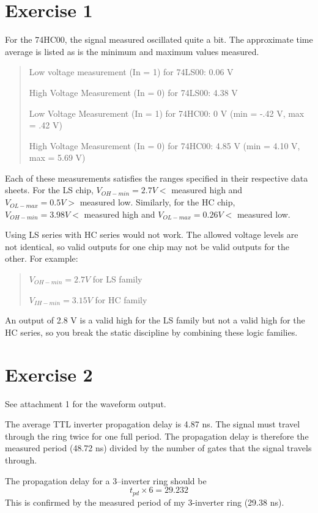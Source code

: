 \documentclass{article}
\author{Bo Shi}
\begin{document}
\section{Exercise 1}
For the 74HC00, the signal measured oscillated quite a bit.  The approximate
time average is listed as is the minimum and maximum values measured.

\begin{quote}
Low voltage measurement (In = 1) for 74LS00: 0.06 V

High Voltage Measurement (In = 0) for 74LS00: 4.38 V

Low Voltage Measurement (In = 1) for 74HC00: 0 V (min = -.42 V, max = .42 V)

High Voltage Measurement (In = 0) for 74HC00: 4.85 V (min = 4.10 V, max = 5.69 V)
\end{quote}

Each of these measurements satisfies the ranges specified in their respective
data sheets.  For the LS chip, $V_{OH-min} = 2.7 V <$ measured high and $V_{OL-max}
= 0.5 V >$ measured low.  Similarly, for the HC chip, $V_{OH-min} = 3.98 V <$
measured high and $V_{OL-max} = 0.26 V <$ measured low.

Using LS series with HC series would not work.  The allowed voltage levels are
not identical, so valid outputs for one chip may not be valid outputs for the
other.  For example:
\begin{quote}
$V_{OH-min} = 2.7 V$ for LS family

$V_{IH-min} = 3.15 V$ for HC family
\end{quote}
An output of 2.8 V is a valid high for the LS family but not a valid high for
the HC series, so you break the static discipline by combining these logic
families.


\section{Exercise 2}
See attachment 1 for the waveform output.

The average TTL inverter propagation delay is 4.87 ns.  The signal must travel
through the ring twice for one full period.  The propagation delay is therefore
the measured period (48.72 ns) divided by the number of gates that the signal
travels through.

The propagation delay for a 3--inverter ring should be
\[
t_{pd} \times 6 = 29.232
\]
This is confirmed by the measured period of my 3-inverter ring (29.38 ns).
\end{document}
